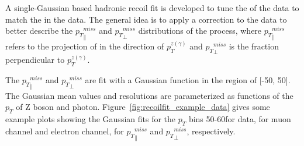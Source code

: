 \vspace{0.3cm}
A single-Gaussian based hadronic recoil fit is developed to tune the \ptmiss of the \gjets data to match the \ptmiss in the \Zjets data. The general idea is to apply a correction to the \gjets data to better describe the ${p_{T}}^{miss}_\parallel$ and ${p_{T}}^{miss}_\perp$ distributions of the \Zjets process, where ${p_{T}}^{miss}_\parallel$ refers to the projection of \ptmiss in the direction of ${p}_{T}^{z(\gamma)}$ and ${p_{T}}^{miss}_\perp$ is the fraction perpendicular to ${p}_{T}^{z(\gamma)}$. 

\vspace{0.3cm}
The ${p_{T}}^{miss}_\parallel$ and ${p_{T}}^{miss}_\perp$ are fit with a Gaussian function in the region of [-50, 50]\GeV. The Gaussian mean values and resolutions are parameterized as functions of the $p_T$ of Z boson and photon. Figure~\ref{fig:recoilfit_example_data} gives some example plots showing the Gaussian fits for the $p_T$ bins 50-60\GeV for \Zjets data, for muon channel and electron channel, for ${p_{T}}^{miss}_\parallel$ and ${p_{T}}^{miss}_\perp$, respectively.
